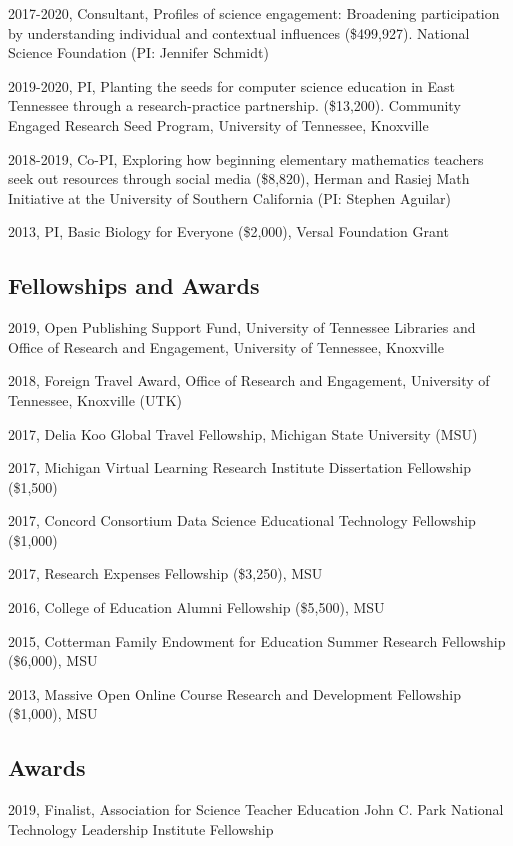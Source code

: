 \documentclass[14,]{article}
\begin{document}
2017-2020, Consultant, Profiles of science engagement: Broadening
participation by understanding individual and contextual influences
(\$499,927). National Science Foundation (PI: Jennifer Schmidt)

2019-2020, PI, Planting the seeds for computer science education in East
Tennessee through a research-practice partnership. (\$13,200). Community
Engaged Research Seed Program, University of Tennessee, Knoxville

2018-2019, Co-PI, Exploring how beginning elementary mathematics
teachers seek out resources through social media (\$8,820), Herman and
Rasiej Math Initiative at the University of Southern California (PI:
Stephen Aguilar)

2013, PI, Basic Biology for Everyone (\$2,000), Versal Foundation Grant

\hypertarget{fellowships-and-awards}{%
\subsection{Fellowships and Awards}\label{fellowships-and-awards}}

2019, Open Publishing Support Fund, University of Tennessee Libraries
and Office of Research and Engagement, University of Tennessee,
Knoxville

2018, Foreign Travel Award, Office of Research and Engagement,
University of Tennessee, Knoxville (UTK)

2017, Delia Koo Global Travel Fellowship, Michigan State University
(MSU)

2017, Michigan Virtual Learning Research Institute Dissertation
Fellowship (\$1,500)

2017, Concord Consortium Data Science Educational Technology Fellowship
(\$1,000)

2017, Research Expenses Fellowship (\$3,250), MSU

2016, College of Education Alumni Fellowship (\$5,500), MSU

2015, Cotterman Family Endowment for Education Summer Research
Fellowship (\$6,000), MSU

2013, Massive Open Online Course Research and Development Fellowship
(\$1,000), MSU

\hypertarget{awards}{%
\subsection{Awards}\label{awards}}

2019, Finalist, Association for Science Teacher Education John C. Park
National Technology Leadership Institute Fellowship
\end{document}
